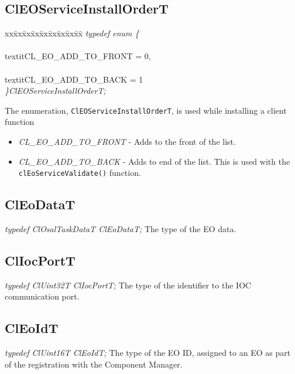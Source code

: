 \begin{flushleft}
\subsection{ClEOServiceInstallOrderT}
\begin{tabbing}
xx\=xx\=xx\=xx\=xx\=xx\=xx\=xx\=xx\=\kill
\textit{typedef enum \{}\\
\>\>\>\\textit{CL\_EO\_ADD\_TO\_FRONT  = 0,}\\
\>\>\>\\textit{CL\_EO\_ADD\_TO\_BACK   = 1}\\
\textit{\}ClEOServiceInstallOrderT;}\end{tabbing}
The enumeration, {\tt{ClEOServiceInstallOrderT}}, is used while installing a client function 
\begin{itemize}
 \item
 \textit{CL\_\-EO\_\-ADD\_\-TO\_\-FRONT} - Adds to the front of the list.
 \item
\textit{CL\_\-EO\_\-ADD\_\-TO\_\-BACK} - Adds to end of the list. This is used with the {\tt{clEoServiceValidate()}} function.
  \end{itemize}




\subsection{ClEoDataT}
\textit{typedef ClOsalTaskDataT ClEoDataT;}
  \newline
  \newline
The type of the EO data.

\subsection{ClIocPortT}
\textit{typedef ClUint32T ClIocPortT;}
  \newline
  \newline
The type of the identifier to the IOC communication port.


\subsection{ClEoIdT}
\textit{typedef ClUint16T ClEoIdT;}
  \newline
  \newline
The type of the EO ID, assigned to an EO as part of the registration with the Component Manager.





\end{flushleft}
